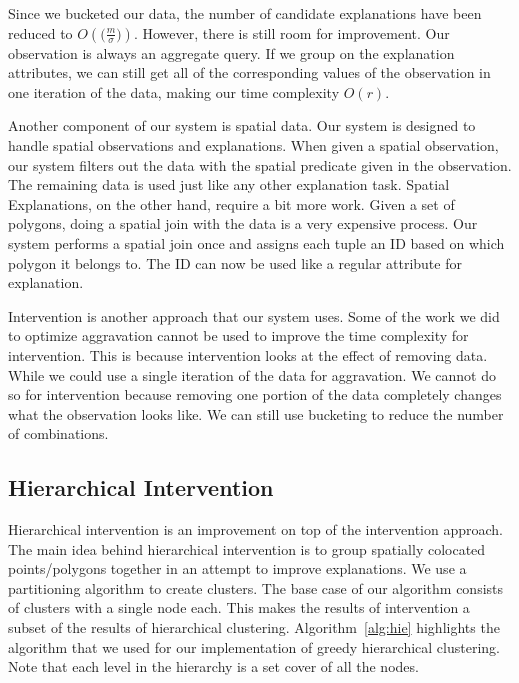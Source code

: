 Since we bucketed our data, the number of candidate explanations have been reduced to $O(\big(\frac{m}{\sigma}\big))$. However, there is still room for improvement. Our observation is always an aggregate query. If we group on the explanation attributes, we can still get all of the corresponding values of the observation in one iteration of the data, making our time complexity $O(r)$.

Another component of our system is spatial data. Our system is designed to handle spatial observations and explanations. When given a spatial observation, our system filters out the data with the spatial predicate given in the observation. The remaining data is used just like any other explanation task. Spatial Explanations, on the other hand, require a bit more work. Given a set of polygons, doing a spatial join with the data is a very expensive process. Our system performs a spatial join once and assigns each tuple an ID based on which polygon it belongs to. The ID can now be used like a regular attribute for explanation.


\label{intervention_impl}

Intervention is another approach that our system uses. Some of the work we did to optimize aggravation cannot be used to improve the time complexity for intervention. This is because intervention looks at the effect of removing data. While we could use a single iteration of the data for aggravation. We cannot do so for intervention because removing one portion of the data completely changes what the observation looks like. We can still use bucketing to reduce the number of combinations.


\subsection{Hierarchical Intervention}
\label{sec:hie_impl}
Hierarchical intervention is an improvement on top of the intervention approach. The main idea behind hierarchical intervention is to group spatially colocated points/polygons together in an attempt to improve explanations. We use a partitioning algorithm to create clusters. The base case of our algorithm consists of clusters with a single node each. This makes the results of intervention a subset of the results of hierarchical clustering. Algorithm~\ref{alg:hie} highlights the algorithm that we used for our implementation of greedy hierarchical clustering. Note that each level in the hierarchy is a set cover of all the nodes.

